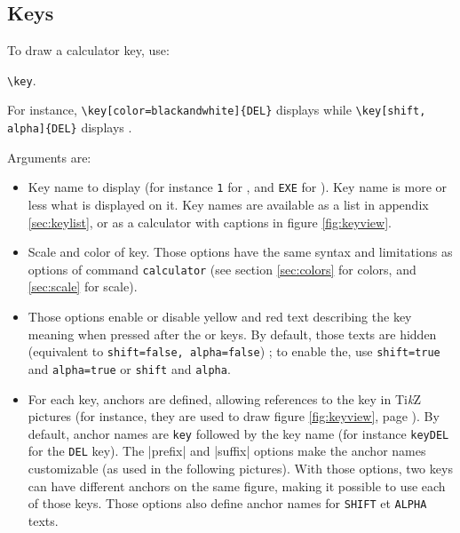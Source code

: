 \documentclass{ltxdoc}
\newcommand{\TikZ}{Ti\emph{k}Z}
\begin{document}
 \subsection{Keys}

 \DescribeMacro{\key}
 To draw a calculator key, use:
 \begin{center}
 \lstinline|\key|.
 \end{center}

 For instance, \lstinline|\key[color=blackandwhite]{DEL}| displays  while \lstinline|\key[shift, alpha]{DEL}| displays .

 Arguments are:
 \begin{itemize}
 \item {} Key name to display (for instance \lstinline|1| for , and \lstinline|EXE| for ). Key name is more or less what is displayed on it. Key names are available as a list in appendix \ref{sec:keylist}, or as a calculator with captions in figure \ref{fig:keyview}.
 \item {} Scale and color of key. Those options have the same syntax and limitations as options of command \lstinline|calculator| (see section \ref{sec:colors} for colors, and \ref{sec:scale} for scale).
 \item {} Those options enable or disable yellow and red text describing the key meaning when pressed after the  or  keys. By default, those texts are hidden (equivalent to \texttt{shift=false, alpha=false}) ; to enable the, use \texttt{shift=true} and \texttt{alpha=true} or \texttt{shift} and \texttt{alpha}.
 \item {} For each key, anchors are defined, allowing references to the key in \TikZ{} pictures (for instance, they are used to draw figure \ref{fig:keyview}, page \pageref{fig:keyview}). By default, anchor names are \texttt{key} followed by the key name (for instance \texttt{keyDEL} for the \texttt{DEL} key). The |prefix| and |suffix| options make the anchor names customizable (as used in the following pictures). With those options, two keys can have different anchors on the same figure, making it possible to use each of those keys.
   Those options also define anchor names for \texttt{SHIFT} et \texttt{ALPHA} texts.
 \begin{center}
\end{center}
\end{itemize}
\end{document}
